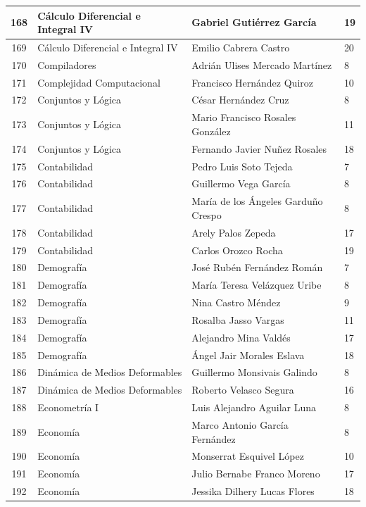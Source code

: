{\begin{longtable}{|c|p{6.5cm}|p{5cm}|p{1.5cm}|}
168 & Cálculo Diferencial e Integral IV & Gabriel Gutiérrez García & 19 \\ \hline
169 & Cálculo Diferencial e Integral IV & Emilio Cabrera Castro & 20 \\ \hline
170 & Compiladores & Adrián Ulises Mercado Martínez & 8 \\ \hline
171 & Complejidad Computacional & Francisco Hernández Quiroz & 10 \\ \hline
172 & Conjuntos y Lógica & César Hernández Cruz & 8 \\ \hline
173 & Conjuntos y Lógica & Mario Francisco Rosales González & 11 \\ \hline
174 & Conjuntos y Lógica & Fernando Javier Nuñez Rosales & 18 \\ \hline
175 & Contabilidad & Pedro Luis Soto Tejeda & 7 \\ \hline
176 & Contabilidad & Guillermo Vega García & 8 \\ \hline
177 & Contabilidad & María de los Ángeles Garduño Crespo & 8 \\ \hline
178 & Contabilidad & Arely Palos Zepeda & 17 \\ \hline
179 & Contabilidad & Carlos Orozco Rocha & 19 \\ \hline
180 & Demografía & José Rubén Fernández Román & 7 \\ \hline
181 & Demografía & María Teresa Velázquez Uribe & 8 \\ \hline
182 & Demografía & Nina Castro Méndez & 9 \\ \hline
183 & Demografía & Rosalba Jasso Vargas & 11 \\ \hline
184 & Demografía & Alejandro Mina Valdés & 17 \\ \hline
185 & Demografía & Ángel Jair Morales Eslava & 18 \\ \hline
186 & Dinámica de Medios Deformables & Guillermo Monsivais Galindo & 8 \\ \hline
187 & Dinámica de Medios Deformables & Roberto Velasco Segura & 16 \\ \hline
188 & Econometría I & Luis Alejandro Aguilar Luna & 8 \\ \hline
189 & Economía & Marco Antonio García Fernández & 8 \\ \hline
190 & Economía & Monserrat Esquivel López & 10 \\ \hline
191 & Economía & Julio Bernabe Franco Moreno & 17 \\ \hline
192 & Economía & Jessika Dilhery Lucas Flores & 18 \\ \hline

\end{longtable}}
